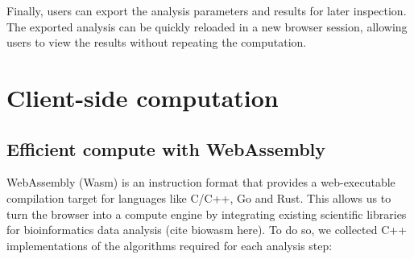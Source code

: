 \documentclass{article}
\begin{document}
Finally, users can export the analysis parameters and results for later inspection.
The exported analysis can be quickly reloaded in a new browser session, allowing users to view the results without repeating the computation.

\section{Client-side computation}

\subsection{Efficient compute with WebAssembly}

WebAssembly (Wasm) is an instruction format that provides a web-executable compilation target for languages like C/C++, Go and Rust.
This allows us to turn the browser into a compute engine by integrating existing scientific libraries for bioinformatics data analysis (cite biowasm here).
To do so, we collected C++ implementations of the algorithms required for each analysis step:
\end{document}
